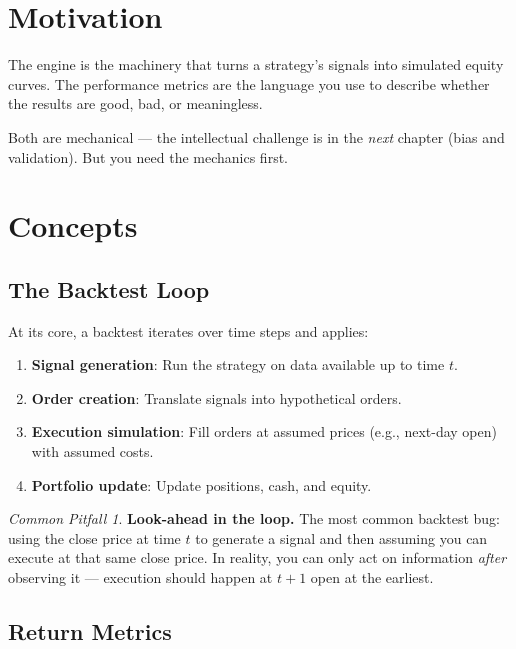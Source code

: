 \documentclass[a4paper, 11pt]{report}
\theoremstyle{definition}
\theoremstyle{remark}
\newtheorem{pitfall}{Common Pitfall}[chapter]
\begin{document}
\section{Motivation}

The engine is the machinery that turns a strategy's signals into simulated
equity curves.  The performance metrics are the language you use to describe
whether the results are good, bad, or meaningless.

Both are mechanical --- the intellectual challenge is in the \emph{next} chapter
(bias and validation).  But you need the mechanics first.

\section{Concepts}

\subsection{The Backtest Loop}

At its core, a backtest iterates over time steps and applies:

\begin{enumerate}
    \item \textbf{Signal generation}: Run the strategy on data available up to
          time $t$.
    \item \textbf{Order creation}: Translate signals into hypothetical orders.
    \item \textbf{Execution simulation}: Fill orders at assumed prices
          (e.g., next-day open) with assumed costs.
    \item \textbf{Portfolio update}: Update positions, cash, and equity.
\end{enumerate}

\begin{pitfall}
    \textbf{Look-ahead in the loop.}  The most common backtest bug: using the
    close price at time $t$ to generate a signal and then assuming you can
    execute at that same close price.  In reality, you can only act on
    information \emph{after} observing it --- execution should happen at
    $t+1$ open at the earliest.
\end{pitfall}

\subsection{Return Metrics}
\end{document}
